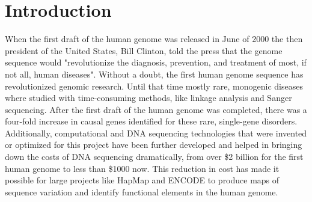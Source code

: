 \chapterfont{\color{WongDarkBlue}}  %
\sectionfont{\color{WongDarkBlue}}  %
\subsectionfont{\color{WongDarkBlue}}  %

\renewcommand\pcolor{WongDarkBlue}
\renewcommand{\headrule}{\hbox to\headwidth{%
		\color{WongDarkBlue}\leaders\hrule height \headrulewidth\hfill}} %
\fancyfoot[LE,RO]{\thepage}

\chapter{Introduction}
\label{chap:introduction}

{ \Large {} }

\newpage

\noindent

When the first draft of the human genome was released in June of 2000 the then president of the United States, Bill Clinton, told the press that the genome sequence would "revolutionize the diagnosis, prevention, and treatment of most, if not all, human diseases"\cite{collinsHasRevolutionArrived2010a}. Without a doubt, the first human genome sequence has revolutionized genomic research. Until that time mostly rare, monogenic diseases where studied with time-consuming methods, like linkage analysis and Sanger sequencing. After the first draft of the human genome was completed, there was a four-fold increase in causal genes identified for these rare, single-gene disorders\cite{claussnitzerBriefHistoryHuman2020b}. Additionally, computational and DNA sequencing technologies that were invented or optimized for this project\cite{hoodHumanGenomeProject2013} have been further developed and helped in bringing down the costs of DNA sequencing dramatically, from over \$2 billion for the first human genome to less than \$1000 now. This reduction in cost has made it possible for large projects like HapMap\cite{theinternationalhapmapconsortiumInternationalHapMapProject2003} and ENCODE\cite{consortiumENCODEENCyclopediaDNA2004} to produce maps of sequence variation and identify functional elements in the human genome. 

